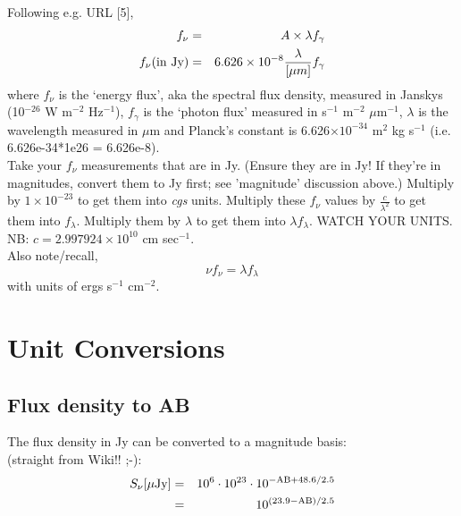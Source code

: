 \documentclass[11pt,a4paper]{article}
\begin{document}
\noindent
Following e.g. URL [5], 
\begin{eqnarray}
f_{\nu}                      & = & A \times \lambda f_{\gamma}\\
f_{\nu} {\rm (in\ Jy)} & = & 6.626\times10^{-8} \frac{\lambda}{[\mu m]} f_{\gamma}\\
\end{eqnarray}
where $f_{\nu}$ is the `energy flux', aka the spectral flux density,
measured in Janskys (10$^{-26}$ W m$^{-2}$ Hz$^{-1}$), $f_{\gamma}$ is
the `photon flux' measured in s$^{-1}$ m$^{-2}$ $\mu$m$^{-1}$,
$\lambda$ is the wavelength measured in $\mu$m and Planck's constant
is 6.626$\times10^{-34}$ m$^{2}$ kg s$^{-1}$ (i.e. 6.626e-34*1e26 =
6.626e-8).\\

\noindent
Take your $f_{\nu}$ measurements that are in Jy. (Ensure they are in
Jy! If they're in magnitudes, convert them to Jy first; see
'magnitude' discussion above.) Multiply by $1\times10^{-23}$ to get
them into {\it cgs} units. Multiply these $f_{\nu}$ values by
$\frac{c}{\lambda^{2}}$ to get them into $f_{\lambda}$. Multiply them
by $\lambda$ to get them into $\lambda f_{\lambda}$. WATCH YOUR
UNITS. NB: $c = 2.997924\times10^{10}$ cm sec$^{-1}$. \\

\noindent
Also note/recall, 
\begin{equation}
  \nu  f_{\nu}    =  \lambda  f_{\lambda}
\end{equation}
with units of ergs s$^{-1}$ cm$^{-2}$. 

\section{Unit Conversions}
    \subsection{Flux density to AB}
    The flux density in Jy can be converted to a magnitude basis:\\
    (straight from Wiki!! ;-):\\
    \begin{eqnarray}
      S_{\nu} [\mu {\rm Jy} ]  & = & 10^{6} \cdot 10^{23} \cdot 10^{-{{\rm AB} +48.6/2.5 }} \\
                                        & = & 10^{(23.9 - {\rm AB})/2.5} \\
    \end{eqnarray}

\end{document}
